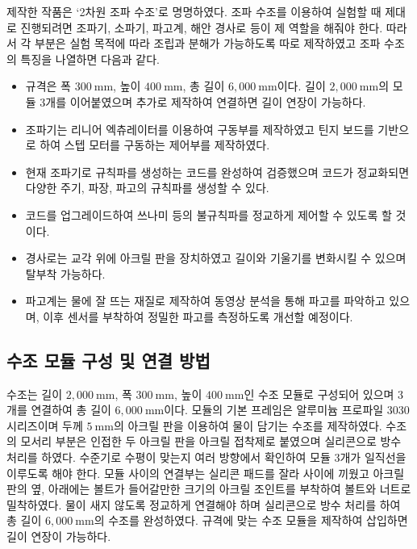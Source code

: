 제작한 작품은 `2차원 조파 수조'로 명명하였다. 조파 수조를 이용하여 실험할 때 제대로 진행되려면 조파기, 소파기, 파고계, 해안 경사로 등이 제 역할을 해줘야 한다. 따라서 각 부분은 실험 목적에 따라 조립과 분해가 가능하도록 따로 제작하였고 조파 수조의 특징을 나열하면 다음과 같다.

\begin{itemize}
    \item 규격은 폭 $300~\mathrm{mm}$, 높이 $400~\mathrm{mm}$, 총 길이 $6,000~\mathrm{mm}$이다. 길이 $2,000~\mathrm{mm}$의 모듈 3개를 이어붙였으며 추가로 제작하여 연결하면 길이 연장이 가능하다.
    \item 조파기는 리니어 엑츄레이터를 이용하여 구동부를 제작하였고 틴지 보드를 기반으로 하여 스텝 모터를 구동하는 제어부를 제작하였다.
    \item 현재 조파기로 규칙파를 생성하는 코드를 완성하여 검증했으며 코드가 정교화되면 다양한 주기, 파장, 파고의 규칙파를 생성할 수 있다. 
    \item 코드를 업그레이드하여 쓰나미 등의 불규칙파를 정교하게 제어할 수 있도록 할 것이다.
    \item 경사로는 교각 위에 아크릴 판을 장치하였고 길이와 기울기를 변화시킬 수 있으며 탈부착 가능하다.
    \item 파고계는 물에 잘 뜨는 재질로 제작하여 동영상 분석을 통해 파고를 파악하고 있으며, 이후 센서를 부착하여 정밀한 파고를 측정하도록 개선할 예정이다.
\end{itemize}

\subsection{수조 모듈 구성 및 연결 방법}
수조는 길이 $2,000~\mathrm{mm}$, 폭 $300~\mathrm{mm}$, 높이 $400~\mathrm{mm}$인 수조 모듈로 구성되어 있으며 3개를 연결하여 총 길이 $6,000~\mathrm{mm}$이다. 모듈의 기본 프레임은 알루미늄 프로파일 3030 시리즈이며 두께 $5~\mathrm{mm}$의 아크릴 판을 이용하여 물이 담기는 수조를 제작하였다. 수조의 모서리 부분은 인접한 두 아크릴 판을 아크릴 접착제로 붙였으며 실리콘으로 방수 처리를 하였다. 수준기로 수평이 맞는지 여러 방향에서 확인하여 모듈 3개가 일직선을 이루도록 해야 한다. 모듈 사이의 연결부는 실리콘 패드를 잘라 사이에 끼웠고 아크릴 판의 옆, 아래에는 볼트가 들어갈만한 크기의 아크릴 조인트를 부착하여 볼트와 너트로 밀착하였다. 물이 새지 않도록 정교하게 연결해야 하며 실리콘으로 방수 처리를 하여 총 길이 $6,000~\mathrm{mm}$의 수조를 완성하였다. 규격에 맞는 수조 모듈을 제작하여 삽입하면 길이 연장이 가능하다.

